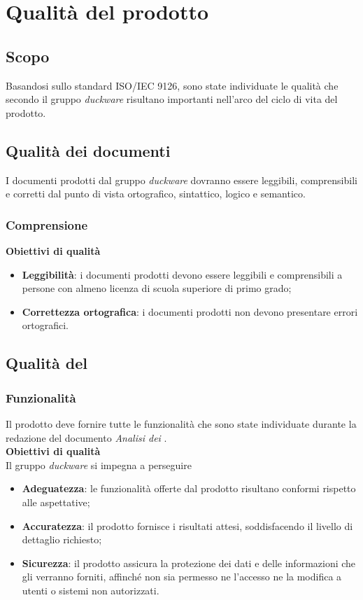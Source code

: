 \clearpage
\section{Qualità del prodotto}
\subsection{Scopo}
Basandosi sullo standard ISO/IEC 9126, sono state individuate le qualità che secondo il gruppo \emph{duckware} risultano importanti nell'arco del ciclo di vita del prodotto.
\subsection{Qualità dei documenti}
I documenti prodotti dal gruppo \emph{duckware} dovranno essere leggibili, comprensibili e corretti dal punto di vista ortografico, sintattico, logico e semantico.
\subsubsection{Comprensione}
\textbf{Obiettivi di qualità}
\begin{itemize}
	\item \textbf{Leggibilità}: i documenti prodotti devono essere leggibili e comprensibili a persone con almeno licenza di scuola superiore di primo grado;
	\item \textbf{Correttezza ortografica}: i documenti prodotti non devono presentare errori ortografici.
\end{itemize}

\subsection{Qualità del }
\subsubsection{Funzionalità}
Il prodotto deve fornire tutte le funzionalità che sono state individuate durante la redazione del documento \emph{Analisi dei }.\\[0.4cm]
\textbf{Obiettivi di qualità}\\[0.4cm]
Il gruppo \emph{duckware} si impegna a perseguire
\begin{itemize}
	\item \textbf{Adeguatezza}: le funzionalità offerte dal prodotto risultano conformi rispetto alle aspettative;
	\item \textbf{Accuratezza}: il prodotto fornisce i risultati attesi, soddisfacendo il livello di dettaglio richiesto;
	\item \textbf{Sicurezza}: il prodotto assicura la protezione dei dati e delle informazioni che gli verranno forniti, affinché non sia permesso ne l'accesso ne la modifica a utenti o sistemi non autorizzati.
\end{itemize}

